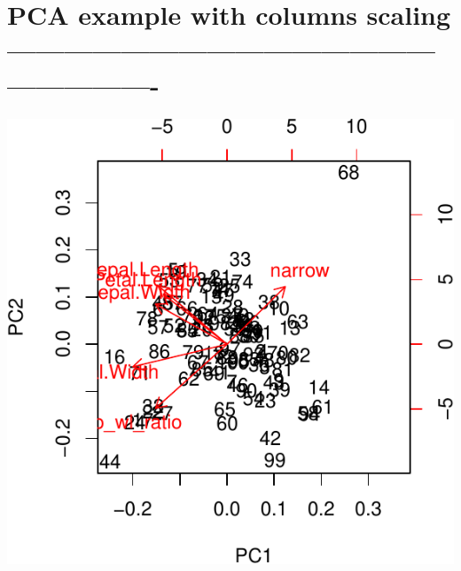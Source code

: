 \documentclass[]{article}
\newenvironment{Shaded}{\begin{snugshade}}{\end{snugshade}}
\newcommand{\CommentTok}[1]{\textcolor[rgb]{0.56,0.35,0.01}{\textit{#1}}}
\newcommand{\DataTypeTok}[1]{\textcolor[rgb]{0.13,0.29,0.53}{#1}}
\newcommand{\KeywordTok}[1]{\textcolor[rgb]{0.13,0.29,0.53}{\textbf{#1}}}
\newcommand{\NormalTok}[1]{#1}
\newcommand{\OperatorTok}[1]{\textcolor[rgb]{0.81,0.36,0.00}{\textbf{#1}}}
\newcommand{\StringTok}[1]{\textcolor[rgb]{0.31,0.60,0.02}{#1}}
\begin{document}
\hypertarget{pca-example-with-columns-scaling--}{%
\section{PCA example with columns scaling
-------------------------------------------------------------}\label{pca-example-with-columns-scaling--}}

\begin{Shaded}
\end{Shaded}

\begin{Shaded}
\end{Shaded}

\includegraphics{R_tidyverse_for_geographers_files/figure-latex/unnamed-chunk-30-1.pdf}
\end{document}
